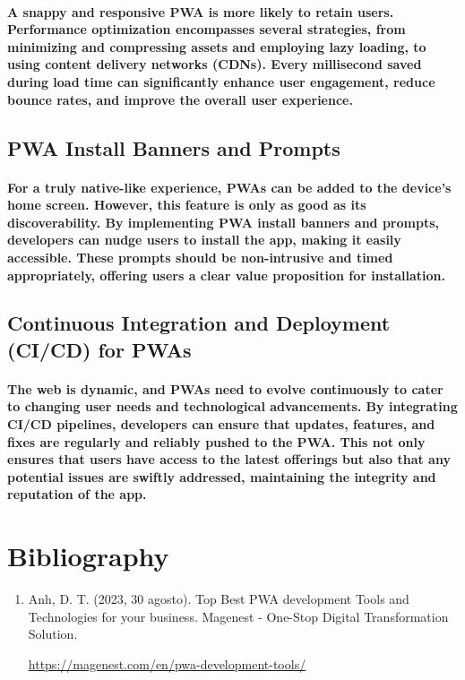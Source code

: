 \documentclass[12pt,a4paper]{article}
\begin{document}
    \paragraph{A snappy and responsive PWA is more likely to retain users. Performance optimization encompasses several strategies, from minimizing and compressing assets and employing lazy loading, to using content delivery networks (CDNs). Every millisecond saved during load time can significantly enhance user engagement, reduce bounce rates, and improve the overall user experience.}
    
    \subsection{PWA Install Banners and Prompts}

    \paragraph{For a truly native-like experience, PWAs can be added to the device’s home screen. However, this feature is only as good as its discoverability. By implementing PWA install banners and prompts, developers can nudge users to install the app, making it easily accessible. These prompts should be non-intrusive and timed appropriately, offering users a clear value proposition for installation.}
    
    \subsection{Continuous Integration and Deployment (CI/CD) for PWAs}

    \paragraph{The web is dynamic, and PWAs need to evolve continuously to cater to changing user needs and technological advancements. By integrating CI/CD pipelines, developers can ensure that updates, features, and fixes are regularly and reliably pushed to the PWA. This not only ensures that users have access to the latest offerings but also that any potential issues are swiftly addressed, maintaining the integrity and reputation of the app.}


\clearpage

	\section{Bibliography}

    \begin{enumerate}
    
      \item Anh, D. T. (2023, 30 agosto). Top Best PWA development Tools and Technologies for your business. Magenest - One-Stop Digital Transformation Solution. 
      
      \href{https://magenest.com/en/pwa-development-tools/}{https://magenest.com/en/pwa-development-tools/}
      
    \end{enumerate}
	
	
\end{document}
